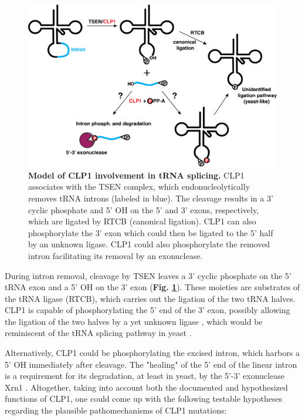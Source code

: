 \documentclass[12pt]{rockefeller}
\begin{document}
\begin{figure}[!ht]%
\centering
\includegraphics[width=\textwidth]{splicing2_v2.png}%
\caption[Model of CLP1 involvement in tRNA splicing.]
{\textbf{Model of CLP1 involvement in tRNA splicing.}
CLP1 associates with the TSEN complex, which endonucleolytically removes tRNA introns (labeled in blue). The cleavage results in a 3' cyclic phosphate and 5' OH on the 5' and 3' exons, respectively, which are ligated by RTCB (canonical ligation). CLP1 can also phosphorylate the 3' exon which could then be ligated to the 5' half by an unknown ligase. CLP1 could also phosphorylate the removed intron facilitating its removal by an exonuclease.}
\centering
\label{splicing}%
\end{figure}

During intron removal, cleavage by \gls{TSEN} leaves a 3' cyclic phosphate on the 5' tRNA exon and a 5' OH on the 3' exon (\textbf{Fig. \ref{splicing}}). These moieties are substrates of the tRNA ligase (RTCB), which carries out the ligation of the two tRNA halves. CLP1 is capable of phosphorylating the 5' end of the 3' exon, possibly allowing the ligation of the two halves by a yet unknown ligase \cite{Weitzer:2007hda}, which would be reminiscent of the tRNA splicing pathway in yeast \cite{Weitzer:2014bi}. 

Alternatively, CLP1 could be phosphorylating the excised intron, which harbors a 5' OH immediately after cleavage. The "healing" of the 5' end of the linear intron is a requirement for its degradation, at least in yeast, by the 5'-3' exonuclease Xrn1 \cite{Wu:2014fb}.
Altogether, taking into account both the documented and hypothesized functions of CLP1, one could come up with the following testable hypotheses regarding the plausible pathomechanisms of CLP1 mutations:
	
\end{document}
